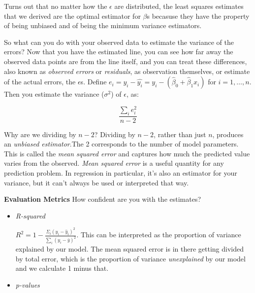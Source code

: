 \begin{tcolorbox}[enhanced jigsaw, breakable, pad at break*=1mm, colback=gray!20!white, colframe=black!85!black, title=\textbf{How to fit the model?}]
    Turns out that no matter how the \(\epsilon\) are distributed, the least squares estimates that we derived are the optimal estimator for \(\beta\)s becasuse they have the property of being unbiased and of being the minimum variance estimators.
\end{tcolorbox}

So what can you do with your observed data to estimate the variance of the errors? Now that you have the estimated line, you can see how far away the observed data points are from the line itself, and you can treat these differences, also known as \textit{observed errors} or \textit{residuals}, as observation themselves, or estimate of the actual errors, the \(\epsilon\)s. Define \(e_{i}=y_{i}-\hat{y_{i}}=y_{i}-\left(\hat{\beta}_{0}+\hat{\beta}_{1} x_{i}\right)\) for \(i=1, \ldots, n\). Then you estimate the variance (\(\sigma^{2}\)) of \(\epsilon\), as:

\begin{equation}
    \frac{\sum_{i} e_{i}^{2}}{n-2}
\end{equation}

Why are we dividing by \(n-2\)? Dividing by \(n-2\), rather than just \(n\), produces an \textit{unbiased estimator}.The 2 corresponds to the number of model parameters. This is called the \textit{mean squared error} and captures how much the predicted value varies from the observed. \textit{Mean squared error} is a useful quantity for any prediction problem. In regression in particular, it's also an estimator for your variance, but it can't always be used or interpreted that way.

\textbf{Evaluation Metrics} How confident are you with the estimates?
\begin{itemize}
    \item \textit{R-squared}

          \(R^{2}=1-\frac{\Sigma_{i}\left(y_{i}-\hat{y}_{i}\right)^{2}}{\sum_{i}\left(y_{i}-\bar{y}\right)^{2}}\). This can be interpreted as the proportion of variance explained by our model. The mean squared error is in there getting divided by total error, which is the proportion of variance \textit{unexplained} by our model and we calculate 1 minus that.

    \item \textit{p-values}

\end{itemize}

